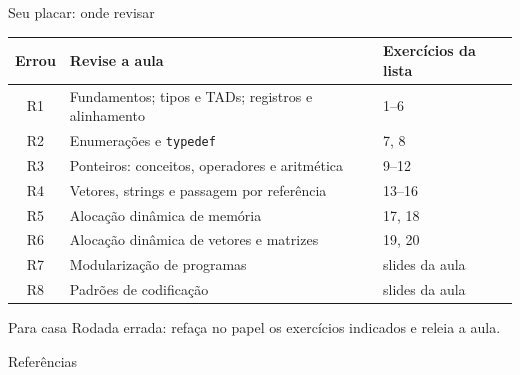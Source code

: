 \documentclass[aspectratio=169]{beamer}
\begin{document}
\begin{frame}{Seu placar: onde revisar}
  \begin{center}
  \small
  \begin{tabular}{@{}cll@{}}
    \toprule
    Errou & Revise a aula & Exercícios da lista \\
    \midrule
    R1 & Fundamentos; tipos e TADs; registros e alinhamento & 1--6 \\
    R2 & Enumerações e \texttt{typedef}                     & 7, 8 \\
    R3 & Ponteiros: conceitos, operadores e aritmética     & 9--12 \\
    R4 & Vetores, strings e passagem por referência        & 13--16 \\
    R5 & Alocação dinâmica de memória                      & 17, 18 \\
    R6 & Alocação dinâmica de vetores e matrizes           & 19, 20 \\
    R7 & Modularização de programas                        & slides da aula \\
    R8 & Padrões de codificação                            & slides da aula \\
    \bottomrule
  \end{tabular}
  \end{center}
  \begin{block}{Para casa}
    \small Rodada errada: refaça no papel os exercícios indicados e releia a aula.
  \end{block}
\end{frame}

\begin{frame}[allowframebreaks]{Referências}
  
  
\end{frame}
\end{document}
